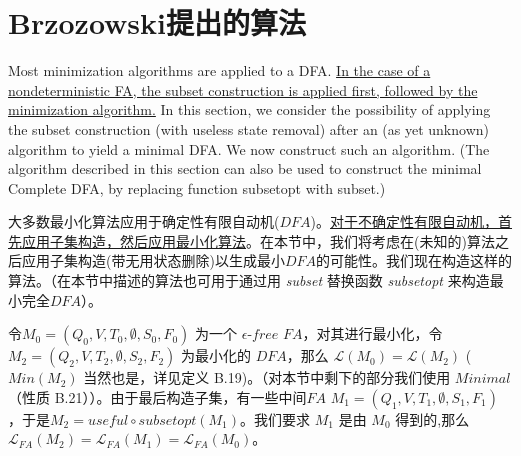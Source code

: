 \section{Brzozowski提出的算法}

Most minimization algorithms are applied to a DFA. \uline{In the case of a nondeterministic FA, the subset construction is applied first, followed by the minimization algorithm.} In this section, we consider the possibility of applying the subset construction (with useless state removal) after an (as yet unknown) algorithm to yield a minimal DFA. We now construct such an algorithm. (The algorithm described in this section can also be used to construct the minimal Complete DFA, by replacing function subsetopt with subset.)

大多数最小化算法应用于确定性有限自动机($DFA$)。\uline{对于不确定性有限自动机，首先应用子集构造，然后应用最小化算法}。在本节中，我们将考虑在(未知的)算法之后应用子集构造(带无用状态删除)以生成最小$DFA$的可能性。我们现在构造这样的算法。（在本节中描述的算法也可用于通过用 \textit{subset} 替换函数 \textit{subsetopt} 来构造最小完全$DFA$）。

令$M_0 = (Q_0,V,T_0,\emptyset ,S_0,F_0)$ 为一个 $\epsilon$-$free$ $FA$，对其进行最小化，令 $M_2 = ( Q_2,V,T_2,\emptyset,S_2,F_2 ) $ 为最小化的 $DFA$，那么 $ \mathcal{L} (M_0) = \mathcal{L}(M_2) $ ( $Min(M_2)$ 当然也是，详见定义 B.19)。（对本节中剩下的部分我们使用 $Minimal$（性质 B.21））。由于最后构造子集，有一些中间$FA$ $M_1 = ( Q_1,V,T_1,\emptyset,S_1,F_1 )$，于是$M_2 = useful \circ subsetopt(M_1)$。我们要求 $M_1$ 是由 $M_0$ 得到的,那么 $ \mathcal{L}_{FA}(M_2) = \mathcal{L}_{FA}(M_1) = \mathcal{L}_{FA}(M_0)$。

